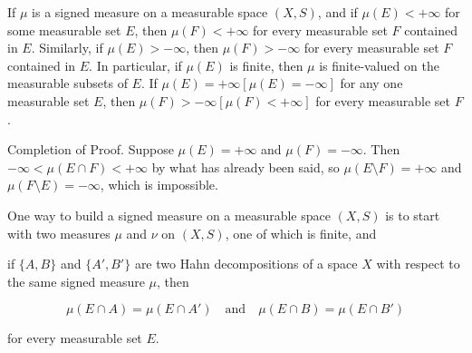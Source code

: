 If $\mu$ is a signed measure on a measurable space $(X, S)$, and if $\mu(E) < +\infty$ for some measurable set $E$, then $\mu(F) < +\infty$ for every measurable set $F$ contained in $E$. Similarly, if $\mu(E) > -\infty$, then $\mu(F) > -\infty$ for every measurable set $F$ contained in $E$. In particular, if $\mu(E)$ is finite, then $\mu$ is finite-valued on the measurable subsets of $E$. If $\mu(E) = +\infty[\mu(E) = -\infty]$ for any one measurable set $E$, then $\mu(F) > -\infty[\mu(F) < +\infty]$ for every measurable set $F$.

Completion of Proof. Suppose $\mu(E) = +\infty$ and $\mu(F) = -\infty$. Then $-\infty < \mu(E \cap F) < +\infty$ by what has already been said, so $\mu(E \setminus F) = +\infty$ and $\mu(F \setminus E) = -\infty$, which is impossible.

One way to build a signed measure on a measurable space $(X, S)$ is to start with two measures $\mu$ and $\nu$ on $(X, S)$, one of which is finite, and

if $\{A, B\}$ and $\{A', B'\}$ are two Hahn decompositions of a space $X$ with respect to the same signed measure $\mu$, then

$$\mu(E \cap A) = \mu(E \cap A') \quad \text{and} \quad \mu(E \cap B) = \mu(E \cap B')$$

for every measurable set $E$.
